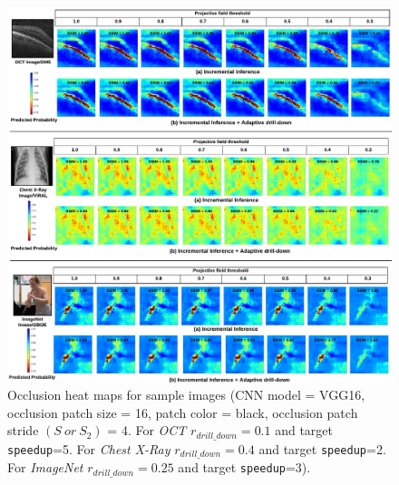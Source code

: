 \begin{figure}[t]
\includegraphics[width=\textwidth]{images/visual_examples}
\caption{Occlusion heat maps for sample images (CNN model = VGG16, occlusion patch size = 16, patch color = black, occlusion patch stride $(S~or~S_2)$ = 4. For \textit{OCT} $r_{drill\_down}=0.1$ and target \texttt{speedup}=5. For \textit{Chest X-Ray} $r_{drill\_down}=0.4$ and target \texttt{speedup}=2. For \textit{ImageNet} $r_{drill\_down}=0.25$ and target \texttt{speedup}=3).}
\label{fig:visual_examples}
\end{figure}

